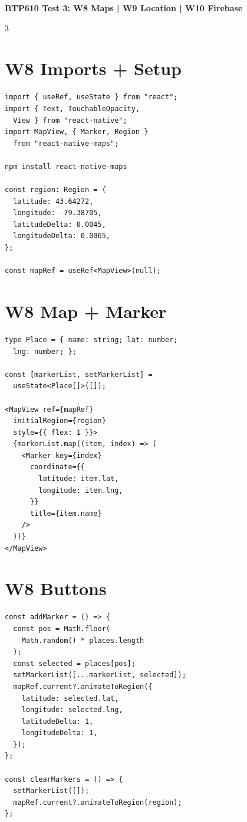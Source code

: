\documentclass[8pt,letterpaper]{extarticle}
\begin{document}
\begin{center}
{\small\bfseries BTP610 Test 3: W8 Maps | W9 Location | W10 Firebase}
\end{center}

\begin{multicols}{3}

\section*{W8 Imports + Setup}
\begin{lstlisting}
import { useRef, useState } from "react";
import { Text, TouchableOpacity,
  View } from "react-native";
import MapView, { Marker, Region }
  from "react-native-maps";

npm install react-native-maps

const region: Region = {
  latitude: 43.64272,
  longitude: -79.38705,
  latitudeDelta: 0.0045,
  longitudeDelta: 0.0065,
};

const mapRef = useRef<MapView>(null);
\end{lstlisting}

\section*{W8 Map + Marker}
\begin{lstlisting}
type Place = { name: string; lat: number;
  lng: number; };

const [markerList, setMarkerList] =
  useState<Place[]>([]);

<MapView ref={mapRef}
  initialRegion={region}
  style={{ flex: 1 }}>
  {markerList.map((item, index) => (
    <Marker key={index}
      coordinate={{
        latitude: item.lat,
        longitude: item.lng,
      }}
      title={item.name}
    />
  ))}
</MapView>
\end{lstlisting}

\section*{W8 Buttons}
\begin{lstlisting}
const addMarker = () => {
  const pos = Math.floor(
    Math.random() * places.length
  );
  const selected = places[pos];
  setMarkerList([...markerList, selected]);
  mapRef.current?.animateToRegion({
    latitude: selected.lat,
    longitude: selected.lng,
    latitudeDelta: 1,
    longitudeDelta: 1,
  });
};

const clearMarkers = () => {
  setMarkerList([]);
  mapRef.current?.animateToRegion(region);
};


\end{lstlisting}
\end{multicols}
\end{document}
